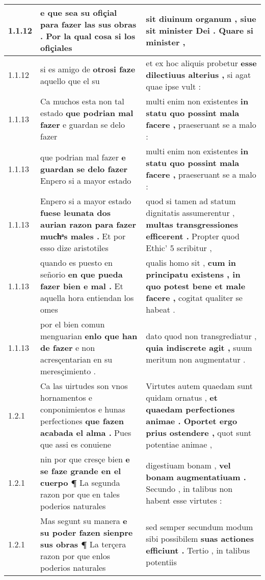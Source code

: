 \begin{tabular}{|p{1cm}|p{6.5cm}|p{6.5cm}|}
1.1.12 & e que sea su ofiçial \textbf{ para fazer las sus obras . } Por la qual cosa si los ofiçiales & sit diuinum organum , \textbf{ siue sit minister Dei . } Quare si minister , \\\hline
1.1.12 & si es amigo de \textbf{ otrosi faze } aquello que el su & et ex hoc aliquis probetur \textbf{ esse dilectiuus alterius , } si agat quae ipse vult : \\\hline
1.1.13 & Ca muchos esta non tal estado \textbf{ que podrian mal fazer } e guardan se delo fazer & multi enim non existentes \textbf{ in statu quo possint mala facere , } praeseruant se a malo : \\\hline
1.1.13 & que podrian mal fazer \textbf{ e guardan se delo fazer } Enpero si a mayor estado & multi enim non existentes \textbf{ in statu quo possint mala facere , } praeseruant se a malo : \\\hline
1.1.13 & Enpero si a mayor estado \textbf{ fuese leunata dos aurian razon para fazer muchͣs males . } Et por esso dize aristotiles & quod si tamen ad statum dignitatis assumerentur , \textbf{ multas transgressiones efficerent . } Propter quod Ethic’ 5 scribitur , \\\hline
1.1.13 & quando es puesto en señorio \textbf{ en que pueda fazer bien e mal . } Et aquella hora entiendan los omes & qualis homo sit , \textbf{ cum in principatu existens , in quo potest bene et male facere , } cogitat qualiter se habeat . \\\hline
1.1.13 & por el bien comun menguarian \textbf{ enlo que han de fazer } e non acresçentarian en su meresçimiento . & dato quod non transgrediatur , \textbf{ quia indiscrete agit , } suum meritum non augmentatur . \\\hline
1.2.1 & Ca las uirtudes son vnos hornamentos e conponimientos e hunas perfectiones \textbf{ que fazen acabada el alma . } Pues que assi es conuiene & Virtutes autem quaedam sunt quidam ornatus , \textbf{ et quaedam perfectiones animae . Oportet ergo prius ostendere , } quot sunt potentiae animae , \\\hline
1.2.1 & nin por que cresçe bien \textbf{ e se faze grande en el cuerpo ¶ } La segunda razon por que en tales poderios naturales & digestiuam bonam , \textbf{ vel bonam augmentatiuam . } Secundo , in talibus non habent esse virtutes : \\\hline
1.2.1 & Mas segunt su manera \textbf{ e su poder fazen sienpre sus obras ¶ } La terçera razon por que enlos poderios naturales & sed semper secundum modum sibi possibilem \textbf{ suas actiones efficiunt . } Tertio , in talibus potentiis \\\hline

\end{tabular}
